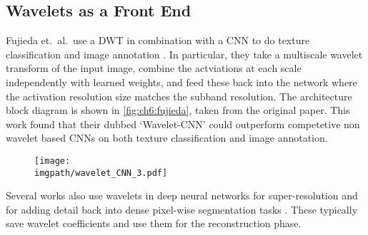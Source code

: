 \subsection{Wavelets as a Front End}
Fujieda et.\ al.\ use a DWT in combination with a
CNN to do texture classification and image annotation 
\cite{fujieda_wavelet_2017, fujieda_wavelet_2018}. In particular, they take a
multiscale wavelet transform of the input image, combine the actviations at each
scale independently with learned weights, and feed these back into the network
where the activation resolution size matches the subband resolution. The
architecture block diagram is shown in \autoref{fig:ch6:fujieda}, taken from the
original paper.  This work found that their dubbed `Wavelet-CNN' could
outperform competetive non wavelet based CNNs on both texture classification and
image annotation.

\begin{figure}[bt]
  \centering
  \texttt{[image: \\imgpath/wavelet\_CNN\_3.pdf]}
  \label{fig:ch6:fujieda}
\end{figure}

Several works also use wavelets in deep neural networks for super-resolution
\cite{guo_deep_2017} and for adding detail back into dense pixel-wise
segmentation tasks \cite{ma_detailed_2018}. These typically save wavelet
coefficients and use them for the reconstruction phase.


